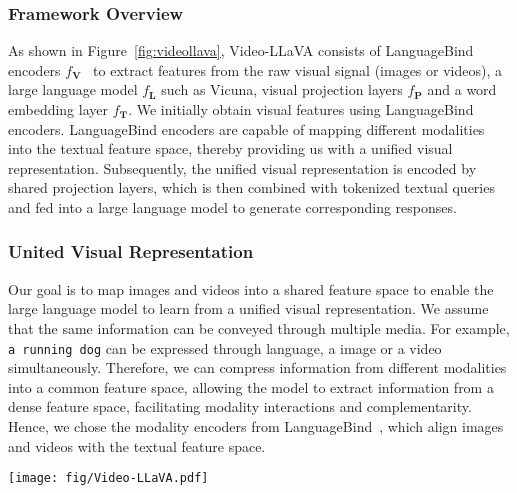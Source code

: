 \subsubsection{Framework Overview}
As shown in Figure~\ref{fig:videollava}, Video-LLaVA consists of LanguageBind encoders $f_{\mathbf{V}}$~\cite{zhu2023languagebind} to extract features from the raw visual signal (images or videos), a large language model $f_{\mathbf{L}}$ such as Vicuna, visual projection layers $f_{\mathbf{P}}$ and a word embedding layer $f_{\mathbf{T}}$. We initially obtain visual features using LanguageBind encoders. LanguageBind encoders are capable of mapping different modalities into the textual feature space, thereby providing us with a unified visual representation. Subsequently, the unified visual representation is encoded by shared projection layers, which is then combined with tokenized textual queries and fed into a large language model to generate corresponding responses.

\subsubsection{United Visual Representation}
Our goal is to map images and videos into a shared feature space to enable the large language model to learn from a unified visual representation. We assume that the same information can be conveyed through multiple media. For example, \texttt{a running dog} can be expressed through language, a image or a video simultaneously. Therefore, we can compress information from different modalities into a common feature space, allowing the model to extract information from a dense feature space, facilitating modality interactions and complementarity. Hence, we chose the modality encoders from LanguageBind~\cite{zhu2023languagebind}, which align images and videos with the textual feature space.

\begin{figure*}[t]
\centering
    \texttt{[image: fig/Video-LLaVA.pdf]}     
\caption{\textbf{Training framework and performance.} Video-LLaVA exhibits remarkable interactive capabilities between images and videos, despite the absence of image-video pairs in the dataset. (a) The Video-LLaVA framework demonstrates a data flow that generates corresponding responses based on input instructions. (b) Video-LLaVA achieves superior performances on a broad range of 15 datasets across image and video.}
\label{fig:videollava}
\end{figure*}

